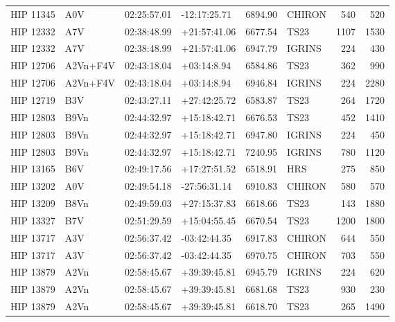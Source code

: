 \documentclass{emulateapj}
\begin{document}
\begin{longtable*}{|l|lllrlrr|}
   HIP 11345 &            A0V &    02:25:57.01 &   -12:17:25.71 &  6894.90 &     CHIRON &      540 &     520 \\
   HIP 12332 &            A7V &    02:38:48.99 &   +21:57:41.06 &  6677.54 &       TS23 &     1107 &    1530 \\
   HIP 12332 &            A7V &    02:38:48.99 &   +21:57:41.06 &  6947.79 &     IGRINS &      224 &     430 \\
   HIP 12706 &       A2Vn+F4V &    02:43:18.04 &    +03:14:8.94 &  6584.86 &       TS23 &      362 &     990 \\
   HIP 12706 &       A2Vn+F4V &    02:43:18.04 &    +03:14:8.94 &  6946.84 &     IGRINS &      224 &    2280 \\
   HIP 12719 &            B3V &    02:43:27.11 &   +27:42:25.72 &  6583.87 &       TS23 &      264 &    1720 \\
   HIP 12803 &           B9Vn &    02:44:32.97 &   +15:18:42.71 &  6676.53 &       TS23 &      452 &    1410 \\
   HIP 12803 &           B9Vn &    02:44:32.97 &   +15:18:42.71 &  6947.80 &     IGRINS &      224 &     450 \\
   HIP 12803 &           B9Vn &    02:44:32.97 &   +15:18:42.71 &  7240.95 &     IGRINS &      780 &    1120 \\
   HIP 13165 &            B6V &    02:49:17.56 &   +17:27:51.52 &  6518.91 &        HRS &      275 &     850 \\
   HIP 13202 &            A0V &    02:49:54.18 &   -27:56:31.14 &  6910.83 &     CHIRON &      580 &     570 \\
   HIP 13209 &           B8Vn &    02:49:59.03 &   +27:15:37.83 &  6618.66 &       TS23 &      143 &    1880 \\
   HIP 13327 &            B7V &    02:51:29.59 &   +15:04:55.45 &  6670.54 &       TS23 &     1200 &    1800 \\
   HIP 13717 &            A3V &    02:56:37.42 &   -03:42:44.35 &  6917.83 &     CHIRON &      644 &     550 \\
   HIP 13717 &            A3V &    02:56:37.42 &   -03:42:44.35 &  6970.75 &     CHIRON &      703 &     550 \\
   HIP 13879 &           A2Vn &    02:58:45.67 &   +39:39:45.81 &  6945.79 &     IGRINS &      224 &     620 \\
   HIP 13879 &           A2Vn &    02:58:45.67 &   +39:39:45.81 &  6681.68 &       TS23 &      930 &     230 \\
   HIP 13879 &           A2Vn &    02:58:45.67 &   +39:39:45.81 &  6618.70 &       TS23 &      265 &    1490 \\

\end{longtable*}
\end{document}
